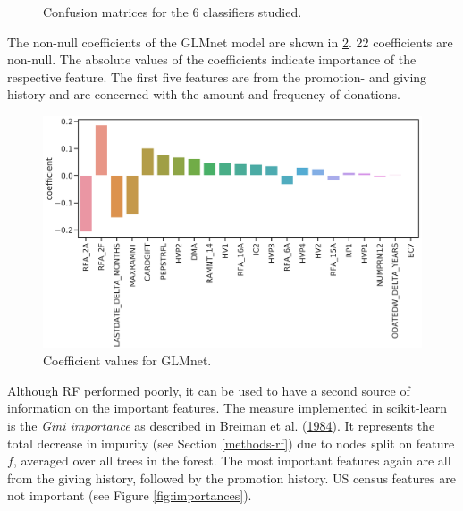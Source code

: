 \documentclass[
  11pt,
  a4paper,
  DIV=12,captions=tableheading,oneside,titlepage]{scrbook}
\begin{document}
\begin{figure}
{}

\caption{Confusion matrices for the 6 classifiers studied.}\label{fig:conf-matrices}
\end{figure}

The non-null coefficients of the GLMnet model are shown in \ref{fig:glmnet-coefficients}. 22 coefficients are non-null. The absolute values of the coefficients indicate importance of the respective feature. The first five features are from the promotion- and giving history and are concerned with the amount and frequency of donations.

\begin{figure}

{\centering \includegraphics[width=1\linewidth]{figures/learning/glmnet_coefficients} 

}

\caption{Coefficient values for GLMnet.}\label{fig:glmnet-coefficients}
\end{figure}

Although RF performed poorly, it can be used to have a second source of information on the important features. The measure implemented in scikit-learn is the \emph{Gini importance} as described in Breiman et al. (\protect\hyperlink{ref-breiman1984classification}{1984}). It represents the total decrease in impurity (see Section \ref{methods-rf}) due to nodes split on feature \(f\), averaged over all trees in the forest. The most important features again are all from the giving history, followed by the promotion history. US census features are not important (see Figure \ref{fig:importances}).
\end{document}
